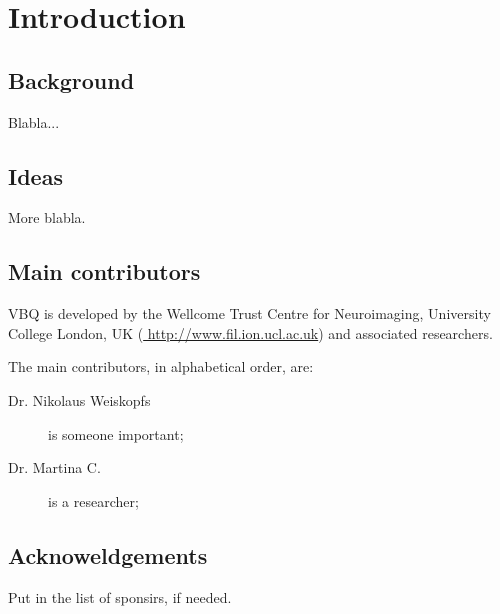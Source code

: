 
\chapter{Introduction}
\label{chap:intro}
\minitoc

\section{Background}

Blabla...

\section{Ideas}

More blabla.

\section{Main contributors}
VBQ is  developed by the Wellcome Trust Centre for Neuroimaging, University College London, UK (\url{ http://www.fil.ion.ucl.ac.uk}) and associated researchers.

The main contributors, in alphabetical order, are: 
\begin{description}
	\item[Dr. Nikolaus Weiskopfs] is someone important;
	\item[Dr. Martina C.] is a researcher;
\end{description}

\section{Acknoweldgements}
Put in the list of sponsirs, if needed.